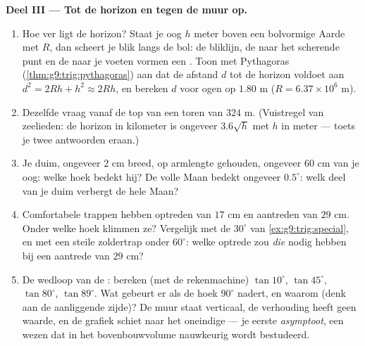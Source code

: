 \begin{problem}
\medskip
\noindent\textbf{Deel III --- Tot de horizon en tegen de muur op.}
\begin{enumerate}[resume]
  \item Hoe ver ligt de horizon? Staat je oog $h$ meter boven een bolvormige Aarde
        met  $R$, dan scheert je blik langs de bol: de bliklijn, de 
        naar het scherende punt en de  naar je voeten vormen een . Toon met Pythagoras (\cref{thm:g9:trig:pythagoras}) aan dat de
        afstand $d$ tot de horizon voldoet aan $d^2 = 2Rh + h^2 \approx 2Rh$, en
        bereken $d$ voor ogen op $1.80$ m ($R = 6.37 \times 10^6$ m).
  \item Dezelfde vraag vanaf de top van een toren van $324$ m. (Vuistregel van
        zeelieden: de horizon in kilometer is ongeveer $3.6\sqrt{h}$ met $h$ in
        meter --- toets je twee antwoorden eraan.)
  \item Je duim, ongeveer $2$ cm breed, op armlengte gehouden, ongeveer $60$ cm van
        je oog: welke hoek bedekt hij? De volle Maan bedekt ongeveer $0.5^\circ$:
        welk deel van je duim verbergt de hele Maan?
  \item Comfortabele trappen hebben optreden van $17$ cm en aantreden van $29$ cm.
        Onder welke hoek klimmen ze? Vergelijk met de $30^\circ$ van
        \cref{ex:g9:trig:special}, en met een steile zoldertrap onder $60^\circ$:
        welke optrede zou \emph{die} nodig hebben bij een aantrede van $29$ cm?
  \item De wedloop van de : bereken (met de rekenmachine)
        $\tan 10^\circ$, $\tan 45^\circ$, $\tan 80^\circ$, $\tan 89^\circ$. Wat
        gebeurt er als de hoek $90^\circ$ nadert, en waarom (denk aan de
        aanliggende zijde)? De muur staat verticaal, de verhouding heeft geen
        waarde, en de grafiek schiet naar het oneindige --- je eerste
        \emph{asymptoot}, een wezen dat in het bovenbouwvolume nauwkeurig wordt
        bestudeerd.
\end{enumerate}
\end{problem}

